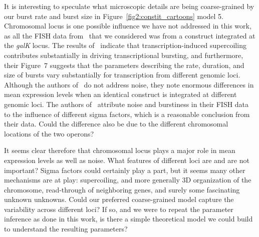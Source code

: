 It is interesting to speculate what microscopic details are being coarse-grained
by our burst rate and burst size in Figure~\ref{fig2:constit_cartoons} model 5.
Chromosomal locus is one possible influence we have not addressed in this work,
as all the FISH data from~\cite{Jones2014} that we considered was from a
construct integrated at the \textit{galK} locus. The results of~\cite{Chong2014}
indicate that transcription-induced supercoiling contributes substantially in
driving transcriptional bursting, and furthermore, their Figure~7 suggests that
the parameters describing the rate, duration, and size of bursts vary
substantially for transcription from different genomic loci. Although the
authors of~\cite{Englaender2017} do not address noise, they note enormous
differences in mean expression levels when an identical construct is integrated
at different genomic loci. The authors of~\cite{Engl2020} attribute noise and
burstiness in their FISH data to the influence of different sigma factors, which
is a reasonable conclusion from their data. Could the difference also be due to
the different chromosomal locations of the two operons?

It seems clear therefore that chromosomal locus plays a major role in mean
expression levels as well as noise. What features of different loci are and are
not important? Sigma factors could certainly play a part, but it seems many
other mechanisms are at play: supercoiling, and more generally 3D organization
of the chromosome, read-through of neighboring genes, and surely some
fascinating unknown unknowns. Could our preferred coarse-grained model capture
the variability across different loci? If so, and we were to repeat the
parameter inference as done in this work, is there a simple theoretical model we
could build to understand the resulting parameters?





